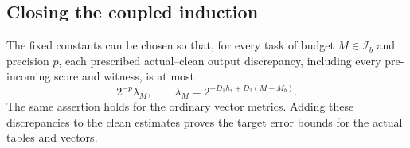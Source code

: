 \subsection{Closing the coupled induction}

\begin{proposition}\label{prop:fp-coupling}
The fixed constants can be chosen so that, for every task of budget
$M\in\mathcal I_b$ and precision $p$, each prescribed actual--clean
output discrepancy, including every pre-incoming score and witness,
is at most
\begin{equation}
 2^{-p}\lambda_M,\qquad
 \lambda_M=2^{-D_1h_*+D_2(M-M_b)}.
 \label{eq:fp-lambda}
\end{equation}
The same assertion holds for the ordinary vector metrics.  Adding
these discrepancies to the clean estimates proves the target error
bounds for the actual tables and vectors.
\end{proposition}


